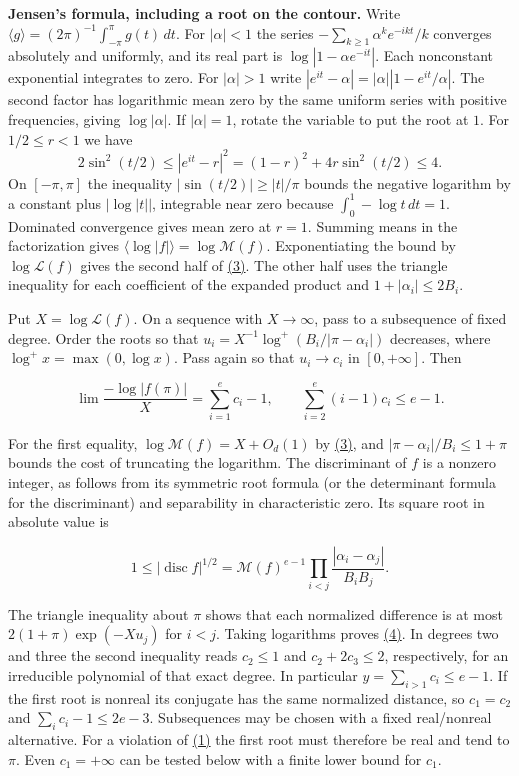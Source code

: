 \documentclass[11pt,a4paper]{article}
\begin{document}
\textbf{Jensen's formula, including a root on the contour.} Write \(\langle g\rangle=(2\pi)^{-1}\int_{-\pi}^{\pi}g(t)\,dt\). For \(|\alpha|<1\) the series \(-\sum_{k\ge1}\alpha^ke^{-ikt}/k\) converges absolutely and uniformly, and its real part is \(\log|1-\alpha e^{-it}|\). Each nonconstant exponential integrates to zero. For \(|\alpha|>1\) write \(|e^{it}-\alpha|=|\alpha||1-e^{it}/\alpha|\). The second factor has logarithmic mean zero by the same uniform series with positive frequencies, giving \(\log|\alpha|\). If \(|\alpha|=1\), rotate the variable to put the root at \(1\). For \(1/2\le r<1\) we have \[
 2\sin^2(t/2)\le |e^{it}-r|^2=(1-r)^2+4r\sin^2(t/2)\le4 .
\] On \([-\pi,\pi]\) the inequality \(|\sin(t/2)|\ge |t|/\pi\) bounds the negative logarithm by a constant plus \(|\log |t||\), integrable near zero because \(\int_0^1-\log t\,dt=1\). Dominated convergence gives mean zero at \(r=1\). Summing means in the factorization gives \(\langle\log |f|\rangle=\log\mathcal M(f)\). Exponentiating the bound by \(\log\mathcal L(f)\) gives the second half of \hyperref[eq:3]{(3)}. The other half uses the triangle inequality for each coefficient of the expanded product and \(1+|\alpha_i|\le2B_i\).

Put \(X=\log\mathcal L(f)\). On a sequence with \(X\to\infty\), pass to a subsequence of fixed degree. Order the roots so that \(u_i=X^{-1}\log^+(B_i/|\pi-\alpha_i|)\) decreases, where \(\log^+x=\max(0,\log x)\). Pass again so that \(u_i\to c_i\) in \([0,+\infty]\). Then

\[
 \lim \frac{-\log|f(\pi)|}{X}=\sum_{i=1}^e c_i-1,\qquad
 \sum_{i=2}^e(i-1)c_i\le e-1.                                          \tag{4}\label{eq:4}
\]

For the first equality, \(\log\mathcal M(f)=X+O_d(1)\) by \hyperref[eq:3]{(3)}, and \(|\pi-\alpha_i|/B_i\le1+\pi\) bounds the cost of truncating the logarithm. The discriminant of \(f\) is a nonzero integer, as follows from its symmetric root formula (or the determinant formula for the discriminant) and separability in characteristic zero. Its square root in absolute value is

\[
 1\le |\operatorname{disc} f|^{1/2}
   =\mathcal M(f)^{e-1}\prod_{i<j}\frac{|\alpha_i-\alpha_j|}{B_iB_j}.
\]

The triangle inequality about \(\pi\) shows that each normalized difference is at most \(2(1+\pi)\exp(-Xu_j)\) for \(i<j\). Taking logarithms proves \hyperref[eq:4]{(4)}. In degrees two and three the second inequality reads \(c_2\le1\) and \(c_2+2c_3\le2\), respectively, for an irreducible polynomial of that exact degree. In particular \(y=\sum_{i>1}c_i\le e-1\). If the first root is nonreal its conjugate has the same normalized distance, so \(c_1=c_2\) and \(\sum_i c_i-1\le 2e-3\). Subsequences may be chosen with a fixed real/nonreal alternative. For a violation of \hyperref[eq:1]{(1)} the first root must therefore be real and tend to \(\pi\). Even \(c_1=+\infty\) can be tested below with a finite lower bound for \(c_1\).
\end{document}
